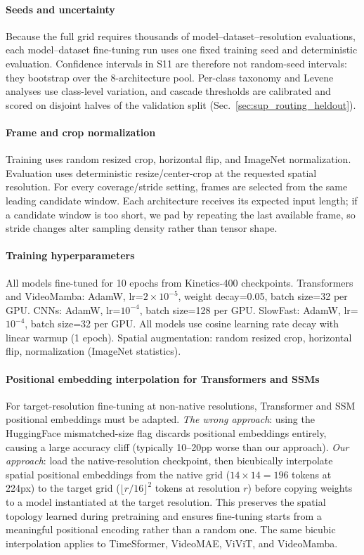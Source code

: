\documentclass[a4paper, 10pt, conference, onecolumn]{ieeeconf}
\begin{document}
\paragraph{Seeds and uncertainty}
Because the full grid requires thousands of model--dataset--resolution evaluations, each model--dataset fine-tuning run uses one fixed training seed and deterministic evaluation. Confidence intervals in S11 are therefore not random-seed intervals: they bootstrap over the 8-architecture pool. Per-class taxonomy and Levene analyses use class-level variation, and cascade thresholds are calibrated and scored on disjoint halves of the validation split (Sec.~\ref{sec:sup_routing_heldout}).

\paragraph{Frame and crop normalization}
Training uses random resized crop, horizontal flip, and ImageNet normalization. Evaluation uses deterministic resize/center-crop at the requested spatial resolution. For every coverage/stride setting, frames are selected from the same leading candidate window. Each architecture receives its expected input length; if a candidate window is too short, we pad by repeating the last available frame, so stride changes alter sampling density rather than tensor shape.

\paragraph{Training hyperparameters}
All models fine-tuned for 10 epochs from Kinetics-400 checkpoints. Transformers and VideoMamba: AdamW, lr=$2\times10^{-5}$, weight decay=0.05, batch size=32 per GPU. CNNs: AdamW, lr=$10^{-4}$, batch size=128 per GPU. SlowFast: AdamW, lr=$10^{-4}$, batch size=32 per GPU. All models use cosine learning rate decay with linear warmup (1 epoch). Spatial augmentation: random resized crop, horizontal flip, normalization (ImageNet statistics).

\paragraph{Positional embedding interpolation for Transformers and SSMs}
For target-resolution fine-tuning at non-native resolutions, Transformer and SSM positional embeddings must be adapted. \textit{The wrong approach}: using the HuggingFace mismatched-size flag discards positional embeddings entirely, causing a large accuracy cliff (typically 10--20pp worse than our approach). \textit{Our approach}: load the native-resolution checkpoint, then bicubically interpolate spatial positional embeddings from the native grid ($14{\times}14{=}196$ tokens at 224px) to the target grid ($\lfloor r/16\rfloor^2$ tokens at resolution $r$) before copying weights to a model instantiated at the target resolution. This preserves the spatial topology learned during pretraining and ensures fine-tuning starts from a meaningful positional encoding rather than a random one. The same bicubic interpolation applies to TimeSformer, VideoMAE, ViViT, and VideoMamba.
\end{document}
